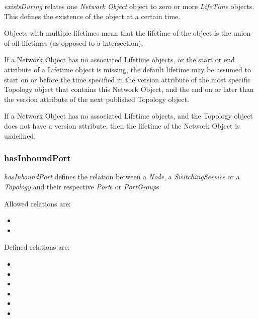 \emph{existsDuring} relates one \emph{Network Object} object to zero or more \emph{LifeTime} objects. This defines the existence of the object at a certain time.


Objects with multiple lifetimes mean that the lifetime of the object is the union of all lifetimes (as opposed to a intersection).

If a Network Object has no associated Lifetime objects, or the start or end attribute of a Lifetime object is missing, the default lifetime may be assumed to start on or before the time specified in the version attribute of the most specific Topology object that contains this Network Object, and the end on or later than the version attribute of the next published Topology object.

If a Network Object has no associated Lifetime objects, and the Topology object does not have a version attribute, then the lifetime of the Network Object is undefined.

\subsubsection{hasInboundPort}%
\label{rel:hasInboundPort}

\emph{hasInboundPort} defines the relation between a \emph{Node}, a \emph{SwitchingService} or a \emph{Topology} and their respective \emph{Port}s or \emph{PortGroup}s

Allowed relations are:
\begin{itemize}
    \item {}
    \item {}
\end{itemize}

Defined relations are:
\begin{itemize}
    \item {}
    \item {}
    \item {}
    \item {}
    \item {}
    \item {}
\end{itemize}

